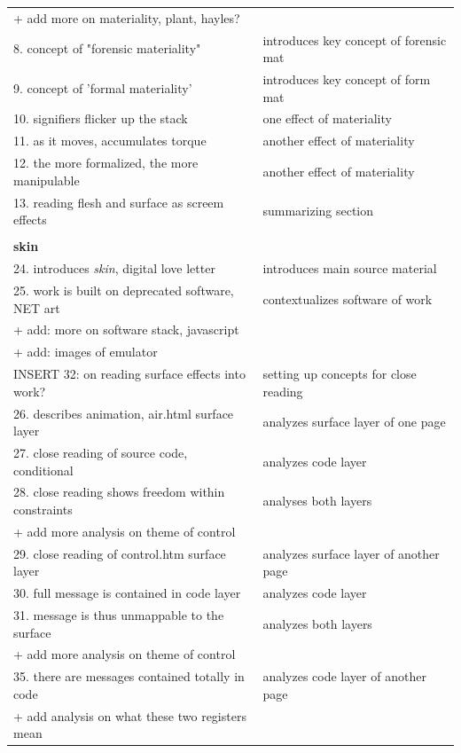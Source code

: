 \documentclass[11pt]{article}
\begin{document}
\begin{center}
\begin{tabular}{ll}
+ add more on materiality, plant, hayles? & \\[0pt]
8. concept of "forensic materiality" & introduces key concept of forensic mat\\[0pt]
9. concept of 'formal materiality' & introduces key concept of form mat\\[0pt]
10. signifiers flicker up the stack & one effect of materiality\\[0pt]
11. as it moves, accumulates torque & another effect of materiality\\[0pt]
12. the more formalized, the more manipulable & another effect of materiality\\[0pt]
13. reading flesh and surface as screem effects & summarizing section\\[0pt]
 & \\[0pt]
\textbf{skin} & \\[0pt]
24. introduces \emph{skin}, digital love letter & introduces main source material\\[0pt]
25. work is built on deprecated software, NET art & contextualizes software of work\\[0pt]
+ add: more on software stack, javascript & \\[0pt]
+ add: images of emulator & \\[0pt]
INSERT 32: on reading surface effects into work? & setting up concepts for close reading\\[0pt]
26. describes animation, air.html surface layer & analyzes surface layer of one page\\[0pt]
27. close reading of source code, conditional & analyzes code layer\\[0pt]
28. close reading shows freedom within constraints & analyses both layers\\[0pt]
+ add more analysis on theme of control & \\[0pt]
29. close reading of control.htm surface layer & analyzes surface layer of another page\\[0pt]
30. full message is contained in code layer & analyzes code layer\\[0pt]
31. message is thus unmappable to the surface & analyzes both layers\\[0pt]
+ add more analysis on theme of control & \\[0pt]
35. there are messages contained totally in code & analyzes code layer of another page\\[0pt]
+ add analysis on what these two registers mean & \\[0pt]

\end{tabular}
\end{center}
\end{document}
